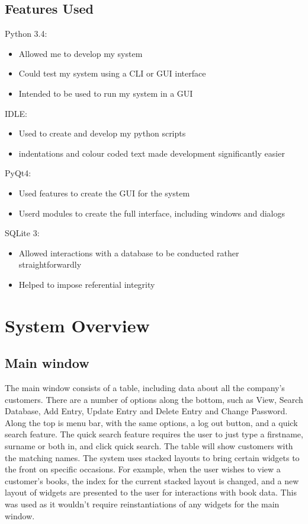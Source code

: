 \subsection{Features Used}



Python 3.4:
\begin{itemize}
    \item Allowed me to develop my system
    \item Could test my system using a CLI or GUI interface
    \item Intended to be used to run my system in a GUI
\end{itemize}

IDLE:
\begin{itemize}    
    \item Used to create and develop my python scripts
    \item indentations and colour coded text made development significantly easier
\end{itemize}

PyQt4:
\begin{itemize}
    \item Used features to create the GUI for the system
    \item Userd modules to create the full interface, including windows and dialogs
\end{itemize}

SQLite 3:
\begin{itemize}
    \item Allowed interactions with a database to be conducted rather straightforwardly
    \item Helped to impose referential integrity
\end{itemize}


\section{System Overview}
 
\subsection{Main window}

The main window consists of a table, including data about all the company's customers. There are a number of options along the bottom, such as View, Search Database, Add Entry, Update Entry and Delete Entry and Change Password. Along the top is  menu bar, with the same options, a log out button, and a quick search feature. The quick search feature requires the user to just type a firstname, surname or both in, and click quick search. The table will show customers with the matching names. The system uses stacked layouts to bring certain widgets to the front on specific occasions. For example, when the user wishes to view a customer's books, the index for the current stacked layout is changed, and a new layout of widgets are presented to the user for interactions with book data. This was used as it wouldn't require reinstantiations of any widgets for the main window.

